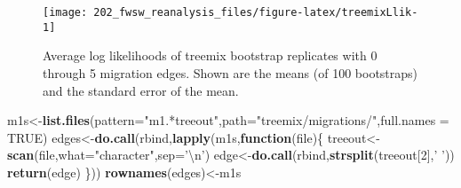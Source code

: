 \documentclass[11pt,]{article}
\newenvironment{Shaded}{\begin{snugshade}}{\end{snugshade}}
\newcommand{\KeywordTok}[1]{\textcolor[rgb]{0.13,0.29,0.53}{\textbf{#1}}}
\newcommand{\DataTypeTok}[1]{\textcolor[rgb]{0.13,0.29,0.53}{#1}}
\newcommand{\DecValTok}[1]{\textcolor[rgb]{0.00,0.00,0.81}{#1}}
\newcommand{\CharTok}[1]{\textcolor[rgb]{0.31,0.60,0.02}{#1}}
\newcommand{\StringTok}[1]{\textcolor[rgb]{0.31,0.60,0.02}{#1}}
\newcommand{\OtherTok}[1]{\textcolor[rgb]{0.56,0.35,0.01}{#1}}
\newcommand{\ControlFlowTok}[1]{\textcolor[rgb]{0.13,0.29,0.53}{\textbf{#1}}}
\newcommand{\NormalTok}[1]{#1}
\begin{document}
\begin{figure}[H]
\texttt{[image: 202\_fwsw\_reanalysis\_files/figure-latex/treemixLlik-1]} \caption{Average log likelihoods of treemix bootstrap replicates with 0 through 5 migration edges. Shown are the means (of 100 bootstraps) and the standard error of the mean.}\label{fig:treemixLlik}
\end{figure}

\begin{Shaded}
\begin{Highlighting}[]
\NormalTok{m1s<-}\KeywordTok{list.files}\NormalTok{(}\DataTypeTok{pattern=}\StringTok{"m1.*treeout"}\NormalTok{,}\DataTypeTok{path=}\StringTok{"treemix/migrations/"}\NormalTok{,}\DataTypeTok{full.names =} \OtherTok{TRUE}\NormalTok{)}
\NormalTok{edges<-}\KeywordTok{do.call}\NormalTok{(rbind,}\KeywordTok{lapply}\NormalTok{(m1s,}\ControlFlowTok{function}\NormalTok{(file)\{}
\NormalTok{  treeout<-}\KeywordTok{scan}\NormalTok{(file,}\DataTypeTok{what=}\StringTok{"character"}\NormalTok{,}\DataTypeTok{sep=}\StringTok{'}\CharTok{\textbackslash{}n}\StringTok{'}\NormalTok{)}
\NormalTok{  edge<-}\KeywordTok{do.call}\NormalTok{(rbind,}\KeywordTok{strsplit}\NormalTok{(treeout[}\DecValTok{2}\NormalTok{],}\StringTok{' '}\NormalTok{))}
  \KeywordTok{return}\NormalTok{(edge)}
\NormalTok{\}))}
\KeywordTok{rownames}\NormalTok{(edges)<-m1s}
\end{Highlighting}
\end{Shaded}
\end{document}

